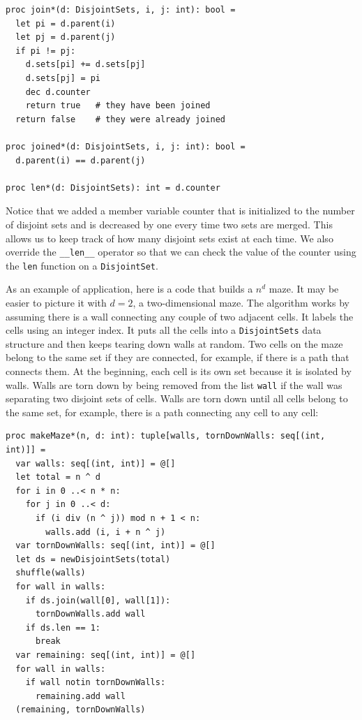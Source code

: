 \documentclass[justified, sixbynine]{tufte-book}
\def\ft{\small\tt}
\theoremstyle{plain}%
\newtheorem * {corollary}{Corollary}
\theoremstyle{definition}
\theoremstyle{remark}
\newtheorem * {remark}{Remark}
\newtheorem * {note}{Note}
\begin{document}
\begin{fullwidth}
\begin{lstlisting}[caption={in file: {\ft nlib.nim}}]
proc join*(d: DisjointSets, i, j: int): bool =
  let pi = d.parent(i)
  let pj = d.parent(j)
  if pi != pj:
    d.sets[pi] += d.sets[pj]
    d.sets[pj] = pi
    dec d.counter
    return true   # they have been joined
  return false    # they were already joined

proc joined*(d: DisjointSets, i, j: int): bool =
  d.parent(i) == d.parent(j)

proc len*(d: DisjointSets): int = d.counter
\end{lstlisting}

Notice that we added a member variable counter that is initialized to the number of disjoint sets and is decreased by one every time two sets are merged. This allows us to keep track of how many disjoint sets exist at each time. We also override the {\ft \_\_len\_\_} operator so that we can check the value of the counter using the {\ft len} function on a {\ft DisjointSet}.

As an example of application, here is a code that builds a $n^d$ maze. It may be easier to picture it with $d=2$, a two-dimensional maze. The algorithm works by assuming there is a wall connecting any couple of two adjacent cells. It labels the cells using an integer index.
It puts all the cells into a {\ft DisjointSets} data structure and then keeps tearing down walls at random. Two cells on the maze belong to the same set if they are connected, for example, if there is a path that connects them. At the beginning, each cell is its own set because it is isolated by walls.
Walls are torn down by being removed from the list {\ft wall} if the wall was separating two disjoint sets of cells. Walls are torn down until all cells belong to the same set, for example, there is a path connecting any cell to any cell:

\begin{lstlisting}[caption={in file: {\ft nlib.nim}}]
proc makeMaze*(n, d: int): tuple[walls, tornDownWalls: seq[(int, int)]] =
  var walls: seq[(int, int)] = @[]
  let total = n ^ d
  for i in 0 ..< n * n:
    for j in 0 ..< d:
      if (i div (n ^ j)) mod n + 1 < n:
        walls.add (i, i + n ^ j)
  var tornDownWalls: seq[(int, int)] = @[]
  let ds = newDisjointSets(total)
  shuffle(walls)
  for wall in walls:
    if ds.join(wall[0], wall[1]):
      tornDownWalls.add wall
    if ds.len == 1:
      break
  var remaining: seq[(int, int)] = @[]
  for wall in walls:
    if wall notin tornDownWalls:
      remaining.add wall
  (remaining, tornDownWalls)
\end{lstlisting}


\end{fullwidth}
\end{document}
